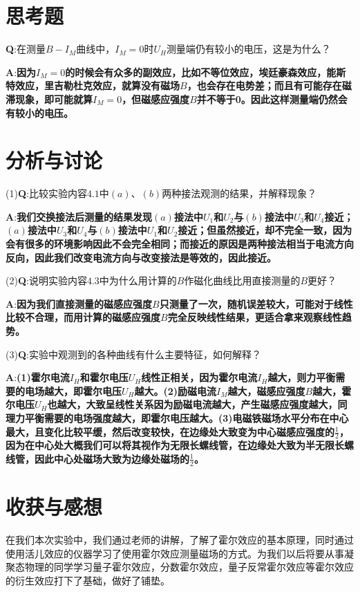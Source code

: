 \documentclass[UTF8]{ctexart}
\begin{document}
	\section{思考题}
	{\large{\textbf{Q}}}:\normalsize 在测量$B-I_{M}$曲线中，$I_{M}=0$时$U_{H}$测量端仍有较小的电压，这是为什么？
	\par{\large{\textbf{A}}}:\normalsize \textbf{因为$I_{M}=0$的时候会有众多的副效应，比如不等位效应，埃廷豪森效应，能斯特效应，里吉勒杜克效应，就算没有磁场$B$，也会存在电势差；而且有可能存在磁滞现象，即可能就算$I_{M}=0$，但磁感应强度$B$并不等于0。因此这样测量端仍然会有较小的电压。}
	\section{分析与讨论}
	(1){\large{\textbf{Q}}}:\normalsize 比较实验内容$4.1$中$(a)、(b)$两种接法观测的结果，并解释现象？
	\par{\large{\textbf{A}}}:\normalsize \textbf{我们交换接法后测量的结果发现$(a)$接法中$U_{1}$和$U_{2}$与$(b)$接法中$U_{3}$和$U_{4}$接近；$(a)$接法中$U_{3}$和$U_{4}$与$(b)$接法中$U_{1}$和$U_{2}$接近；但虽然接近，却不完全一致，因为会有很多的环境影响因此不会完全相同；而接近的原因是两种接法相当于电流方向反向，因此我们改变电流方向与改变接法是等效的，因此接近。}
	\par (2){\large{\textbf{Q}}}:\normalsize 说明实验内容$4.3$中为什么用计算的$B$作磁化曲线比用直接测量的$B$更好？
	\par{\large{\textbf{A}}}:\normalsize \textbf{因为我们直接测量的磁感应强度$B$只测量了一次，随机误差较大，可能对于线性比较不合理，而用计算的磁感应强度$B$完全反映线性结果，更适合拿来观察线性趋势。}
	\par (3){\large{\textbf{Q}}}:\normalsize 实验中观测到的各种曲线有什么主要特征，如何解释？
    \par{\large{\textbf{A}}}:\normalsize\textbf{(1)霍尔电流$I_{H}$和霍尔电压$U_{H}$线性正相关，因为霍尔电流$I_{H}$越大，则力平衡需要的电场越大，即霍尔电压$U_{H}$越大。(2)励磁电流$I_{M}$越大，磁感应强度$B$越大，霍尔电压$U_{H}$也越大，大致呈线性关系因为励磁电流越大，产生磁感应强度越大，同理力平衡需要的电场强度越大，即霍尔电压越大。(3)电磁铁磁场水平分布在中心最大，且变化比较平缓，然后改变较快，在边缘处大致变为中心磁感应强度的$\frac{1}{2}$，因为在中心处大概我们可以将其视作为无限长螺线管，在边缘处大致为半无限长螺线管，因此中心处磁场大致为边缘处磁场的$\frac{1}{2}$。} 
	\section{收获与感想}
    在我们本次实验中，我们通过老师的讲解，了解了霍尔效应的基本原理，同时通过使用活儿效应的仪器学习了使用霍尔效应测量磁场的方式。为我们以后将要从事凝聚态物理的同学学习量子霍尔效应，分数霍尔效应，量子反常霍尔效应等霍尔效应的衍生效应打下了基础，做好了铺垫。
\end{document}
